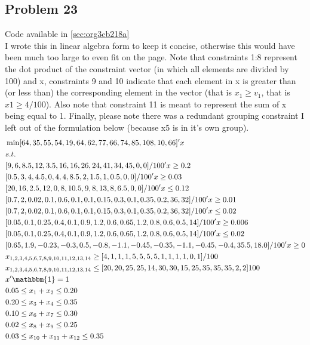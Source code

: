 \documentclass[11pt]{article}
\begin{document}
\subsection{Problem 23}
\label{sec:orgfe951c7}
Code available in \ref{sec:org3cb218a}\\[0pt]
I wrote this in linear algebra form to keep it concise, otherwise this would have been much too large to even fit on the page. Note that constraints 1:8 represent the dot product of the constraint vector (in which all elements are divided by 100) and x, constraints 9 and 10 indicate that each element in x is greater than (or less than) the corresponding element in the vector (that is \(x_1 \geq v_1\), that is \(x1 \geq 4/100\)). Also note that constraint 11 is meant to represent the sum of x being equal to 1. Finally, please note there was a redundant grouping constraint I left out of the formulation below (because x5 is in it's own group).
\begin{align*}
& \min [64,35,55,54,19,64,62,77,66,74,85,108,10,66]' x\\
& s.t.\\
& [9,6,8.5,12,3.5,16,16,26,24,41,34,45,0,0]/100' x \geq 0.2\\
& [0.5,3,4,4.5,0,4,4,8.5,2,1.5,1,0.5,0,0]/100' x \geq 0.03\\
& [20,16,2.5,12,0,8,10.5,9,8,13,8,6.5,0,0]/100' x \leq 0.12\\
& [0.7,2,0.02,0.1,0.6,0.1,0.1,0.15, 0.3,0.1,0.35,0.2,36,32]/100' x \geq 0.01\\
& [0.7,2,0.02,0.1,0.6,0.1,0.1,0.15, 0.3,0.1,0.35,0.2,36,32]/100' x \leq 0.02\\
& [0.05,0.1,0.25,0.4,0.1,0.9,1.2,0.6,0.65,1.2,0.8,0.6,0.5,14]/100' x \geq 0.006\\
& [0.05,0.1,0.25,0.4,0.1,0.9,1.2,0.6,0.65,1.2,0.8,0.6,0.5,14]/100' x \leq 0.02\\
& [0.65,1.9,-0.23,-0.3,0.5,-0.8,-1.1,-0.45,-0.35,-1.1,-0.45,-0.4,35.5,18.0]/100' x \geq 0\\
&  x_{1,2,3,4,5,6,7,8,9,10,11,12,13,14} \geq [4,1,1,1,5,5,5,5,1,1,1,1,0,1]/100\\
&  x_{1,2,3,4,5,6,7,8,9,10,11,12,13,14} \leq [20,20,25,25,14,30,30,15,25,35,35,35,2,2]100\\
&  x'\mathbbm{1} = 1\\
&  0.05 \leq x_1+x_2 \leq 0.20\\
&  0.20 \leq x_3+x_4 \leq 0.35\\
&  0.10 \leq x_6+x_7 \leq 0.30\\
&  0.02 \leq x_8+x_9 \leq 0.25\\
&  0.03 \leq x_{10}+x_{11}+x_{12} \leq 0.35\\
\end{align*}
\end{document}
